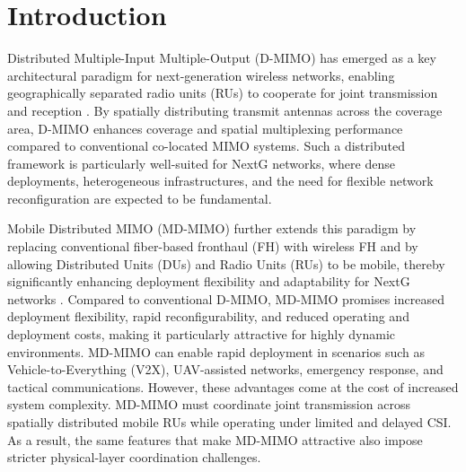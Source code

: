 \documentclass[lettersize,journal]{IEEEtran}
\begin{document}
\section{Introduction}
Distributed Multiple-Input Multiple-Output (D-MIMO) has emerged as a key architectural paradigm for next-generation wireless networks, enabling geographically separated radio units (RUs) to cooperate for joint transmission and reception \cite{comp, mtrp}. 
By spatially distributing transmit antennas across the coverage area, D-MIMO enhances coverage and spatial multiplexing performance compared to conventional co-located MIMO systems. 
Such a distributed framework is particularly well-suited for NextG networks, where dense deployments, heterogeneous infrastructures, and the need for flexible network reconfiguration are expected to be fundamental.

Mobile Distributed MIMO (MD-MIMO) further extends this paradigm by replacing conventional fiber-based fronthaul (FH) with wireless FH and by allowing Distributed Units (DUs) and Radio Units (RUs) to be mobile, thereby significantly enhancing deployment flexibility and adaptability for NextG networks \cite{md_mimo_mag, icnc_dmimo, wiopt}. 
Compared to conventional D-MIMO, MD-MIMO promises increased deployment flexibility, rapid reconfigurability, and reduced operating and deployment costs, making it particularly attractive for highly dynamic environments. 
MD-MIMO can enable rapid deployment in scenarios such as Vehicle-to-Everything (V2X), UAV-assisted networks, emergency response, and tactical communications.
However, these advantages come at the cost of increased system complexity. 
MD-MIMO must coordinate joint transmission across spatially distributed mobile RUs while operating under limited and delayed CSI. 
As a result, the same features that make MD-MIMO attractive also impose stricter physical-layer coordination challenges.
\end{document}
